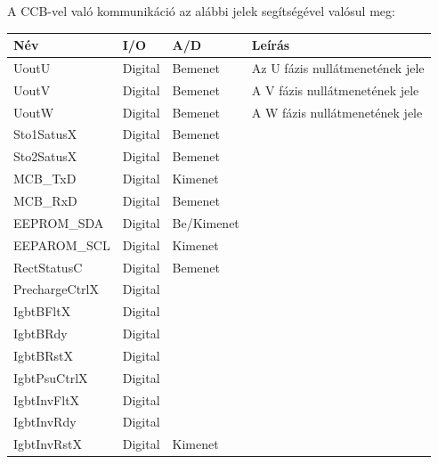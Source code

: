 A CCB-vel való kommunikáció az alábbi jelek segítségével valósul meg:
\begin{table}[]
\centering
\begin{tabular}{|l|l|l|l|}
\hline
\textbf{Név}   & \textbf{I/O} & \textbf{A/D} & \textbf{Leírás}                 \\ \hline
UoutU          & Digital      & Bemenet      & Az U fázis nullátmenetének jele \\ \hline
UoutV          & Digital      & Bemenet      & A V fázis nullátmenetének jele  \\ \hline
UoutW          & Digital      & Bemenet      & A W fázis nullátmenetének jele  \\ \hline
Sto1SatusX     & Digital      & Bemenet      &                                 \\ \hline
Sto2SatusX     & Digital      & Bemenet      &                                 \\ \hline
MCB\_TxD       & Digital      & Kimenet      &                                 \\ \hline
MCB\_RxD       & Digital      & Bemenet      &                                 \\ \hline
EEPROM\_SDA    & Digital      & Be/Kimenet   &                                 \\ \hline
EEPAROM\_SCL   & Digital      & Kimenet      &                                 \\ \hline
RectStatusC    & Digital      & Bemenet      &                                 \\ \hline
PrechargeCtrlX & Digital      &              &                                 \\ \hline
IgbtBFltX      & Digital      &              &                                 \\ \hline
IgbtBRdy       & Digital      &              &                                 \\ \hline
IgbtBRstX      & Digital      &              &                                 \\ \hline
IgbtPsuCtrlX   & Digital      &              &                                 \\ \hline
IgbtInvFltX    & Digital      &              &                                 \\ \hline
IgbtInvRdy     & Digital      &              &                                 \\ \hline
IgbtInvRstX    & Digital      & Kimenet      &                                 \\ \hline

\end{tabular}
\end{table}
